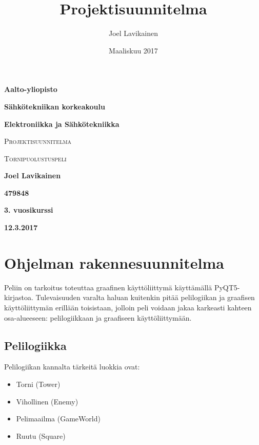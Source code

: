\documentclass{article}
\title{Projektisuunnitelma}
\author{Joel Lavikainen }
\date{Maaliskuu 2017}
\begin{document}
\begin{titlepage}
\raggedright
    {\bfseries Aalto-yliopisto \par}
    {\bfseries Sähkötekniikan korkeakoulu \par}
    {\bfseries Elektroniikka ja Sähkötekniikka \par}
    \vspace{4cm}
\centering
    {\scshape\huge Projektisuunnitelma \par}
    \vspace{1cm}
    {\scshape\large Tornipuolustuspeli \par}
    \vspace{2cm}
    {\bfseries\large Joel Lavikainen \par}
    \vspace{0,1cm}
    {\bfseries\large 479848 \par}
    \vspace{0,1cm}
    {\bfseries\large 3. vuosikurssi \par}
    \vspace{0,1cm}
    {\bfseries\large 12.3.2017 \par}
    \vspace{6cm}

\end{titlepage}



\clearpage
{}
\tableofcontents

\clearpage
{}

\section{Ohjelman rakennesuunnitelma}

Peliin on tarkoitus toteuttaa graafinen käyttöliittymä käyttämällä PyQT5-kir\-jas\-to\-a. Tulevaisuuden varalta haluan kuitenkin pitää pelilogiikan ja graafisen käyttö\-liittymän erillään toisistaan, jolloin peli voidaan jakaa karkeasti kahteen osa-alueeseen: pelilogiikkaan ja graafiseen käyttöliittymään.

\subsection{Pelilogiikka}

Pelilogiikan kannalta tärkeitä luokkia ovat:

\begin{itemize}
    \item Torni (Tower)
    \item Vihollinen (Enemy)
    \item Pelimaailma (GameWorld)
    \item Ruutu (Square)
\end{itemize}
\end{document}
